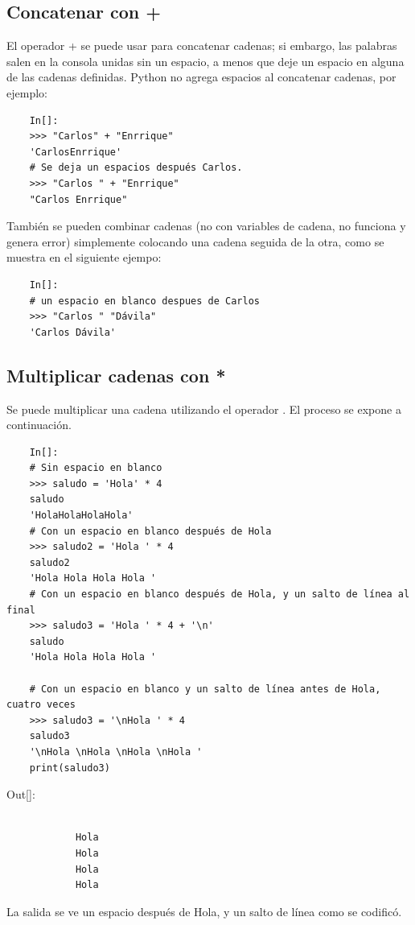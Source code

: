 \subsection{Concatenar con  {\ttfamily +}} 

El operador {\ttfamily +} se puede usar para concatenar cadenas; si embargo, las palabras salen en la consola unidas sin un espacio, a menos que deje un espacio en alguna de las cadenas definidas. Python no agrega espacios al concatenar cadenas, por ejemplo:

\begin{lstlisting} 
	In[]:	
	>>> "Carlos" + "Enrrique"
	'CarlosEnrrique'
	# Se deja un espacios después Carlos.
	>>> "Carlos " + "Enrrique"
	"Carlos Enrrique"
\end{lstlisting}

También se pueden combinar cadenas (no con variables de cadena, no funciona y genera error) simplemente colocando una cadena seguida de la otra, como se muestra en el siguiente ejempo: 

\begin{lstlisting} 
	In[]:	
	# un espacio en blanco despues de Carlos
	>>> "Carlos " "Dávila"
	'Carlos Dávila'
\end{lstlisting}

\subsection{Multiplicar cadenas con *}

Se puede multiplicar una cadena utilizando el operador {\ttfamily *}. El proceso se expone a continuación.

\begin{lstlisting} 
	In[]:
	# Sin espacio en blanco
	>>> saludo = 'Hola' * 4 
	saludo
	'HolaHolaHolaHola'
	# Con un espacio en blanco después de Hola 
	>>> saludo2 = 'Hola ' * 4 
	saludo2
	'Hola Hola Hola Hola '
	# Con un espacio en blanco después de Hola, y un salto de línea al final 
	>>> saludo3 = 'Hola ' * 4 + '\n'
	saludo
	'Hola Hola Hola Hola '
	
	# Con un espacio en blanco y un salto de línea antes de Hola,  cuatro veces   
	>>> saludo3 = '\nHola ' * 4
	saludo3
	'\nHola \nHola \nHola \nHola '
	print(saludo3)
\end{lstlisting}

{\ttfamily\scriptsize\scriptsize 
	\hspace{-0.65cm}Out[]:\vspace{-0.15cm}	
	{\color{blue} 	
		\begin{verbatim}
			
			Hola
			Hola
			Hola
			Hola		
		\end{verbatim}
}} 
\noindent La salida se ve un espacio  después de {\ttfamily Hola}, y un salto de línea  como se codificó. \\

